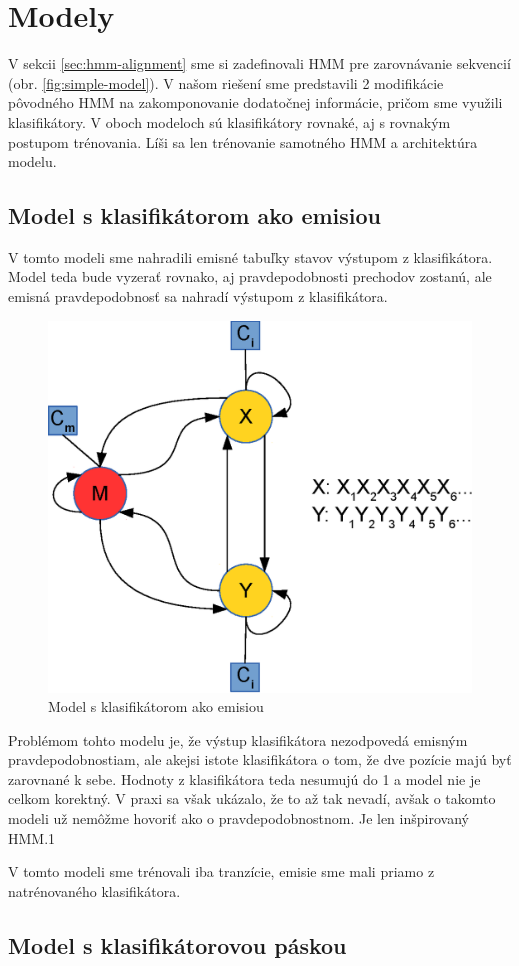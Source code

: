 \chapter{Modely}

V sekcii \ref{sec:hmm-alignment} sme si zadefinovali HMM pre zarovnávanie sekvencií (obr. \ref{fig:simple-model}).
V našom riešení sme predstavili 2 modifikácie pôvodného HMM na zakomponovanie dodatočnej informácie, pričom sme využili klasifikátory. V oboch modeloch sú klasifikátory rovnaké, aj s rovnakým postupom trénovania. Líši sa len trénovanie samotného HMM a architektúra modelu.

\section{Model s klasifikátorom ako emisiou}

V tomto modeli sme nahradili emisné tabuľky stavov výstupom z klasifikátora.
Model teda bude vyzerať rovnako, aj pravdepodobnosti prechodov zostanú, ale emisná pravdepodobnosť sa nahradí výstupom z klasifikátora.

\begin{figure}[htp]
    \centering
    \includegraphics[width=.5\textwidth]{images/model_clf}
    \caption{Model s klasifikátorom ako emisiou}
\end{figure}


Problémom tohto modelu je, že výstup klasifikátora nezodpovedá emisným pravdepodobnostiam, ale akejsi istote klasifikátora o tom, že dve pozície majú byť zarovnané k sebe. Hodnoty z klasifikátora teda nesumujú do 1 a model nie je celkom korektný. V praxi sa však ukázalo, že to až tak nevadí, avšak o takomto modeli už nemôžme hovoriť ako o pravdepodobnostnom. Je len inšpirovaný HMM.1

V tomto modeli sme trénovali iba tranzície, emisie sme mali priamo z natrénovaného klasifikátora.

\section{Model s klasifikátorovou páskou}

